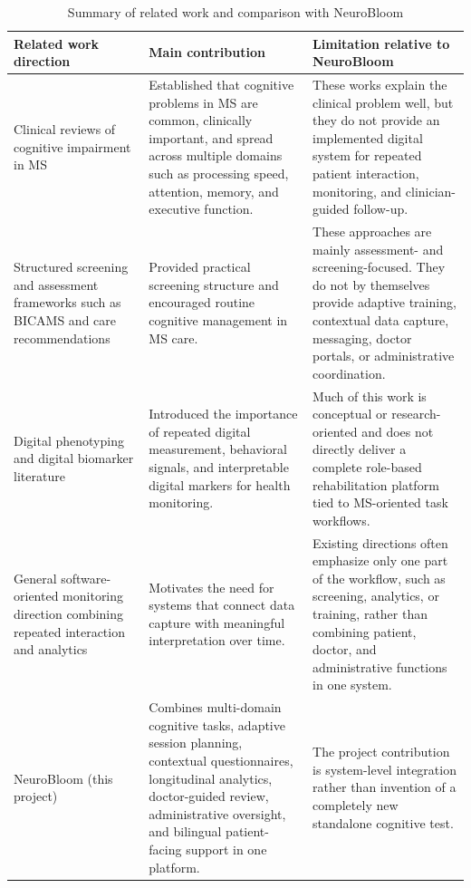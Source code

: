 \documentclass[12pt,a4paper]{report}
\begin{document}
\begin{table}[htbp]
\centering
\caption{Summary of related work and comparison with NeuroBloom}
\label{tab:related_comparison}
\begin{tabularx}{\textwidth}{|p{3.5cm}|X|X|}
\hline
\textbf{Related work direction} & \textbf{Main contribution} & \textbf{Limitation relative to NeuroBloom} \\
\hline
Clinical reviews of cognitive impairment in MS \cite{chiaravalloti2008,amato2006,rocca2015} & Established that cognitive problems in MS are common, clinically important, and spread across multiple domains such as processing speed, attention, memory, and executive function. & These works explain the clinical problem well, but they do not provide an implemented digital system for repeated patient interaction, monitoring, and clinician-guided follow-up. \\
\hline
Structured screening and assessment frameworks such as BICAMS and care recommendations \cite{benedict2012,kalb2018} & Provided practical screening structure and encouraged routine cognitive management in MS care. & These approaches are mainly assessment- and screening-focused. They do not by themselves provide adaptive training, contextual data capture, messaging, doctor portals, or administrative coordination. \\
\hline
Digital phenotyping and digital biomarker literature \cite{insel2017,dorsey2017,coravos2019} & Introduced the importance of repeated digital measurement, behavioral signals, and interpretable digital markers for health monitoring. & Much of this work is conceptual or research-oriented and does not directly deliver a complete role-based rehabilitation platform tied to MS-oriented task workflows. \\
\hline
General software-oriented monitoring direction combining repeated interaction and analytics \cite{kalb2018,coravos2019} & Motivates the need for systems that connect data capture with meaningful interpretation over time. & Existing directions often emphasize only one part of the workflow, such as screening, analytics, or training, rather than combining patient, doctor, and administrative functions in one system. \\
\hline
NeuroBloom (this project) & Combines multi-domain cognitive tasks, adaptive session planning, contextual questionnaires, longitudinal analytics, doctor-guided review, administrative oversight, and bilingual patient-facing support in one platform. & The project contribution is system-level integration rather than invention of a completely new standalone cognitive test. \\
\hline
\end{tabularx}
\end{table}
\end{document}
